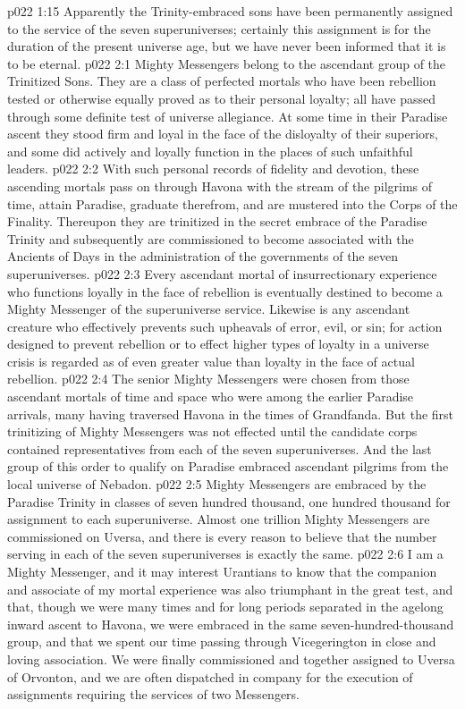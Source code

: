 \vs p022 1:15 Apparently the Trinity\hyp{}embraced sons have been permanently assigned to the service of the seven superuniverses; certainly this assignment is for the duration of the present universe age, but we have never been informed that it is to be eternal.
\vs p022 2:1 Mighty Messengers belong to the ascendant group of the Trinitized Sons. They are a class of perfected mortals who have been rebellion tested or otherwise equally proved as to their personal loyalty; all have passed through some definite test of universe allegiance. At some time in their Paradise ascent they stood firm and loyal in the face of the disloyalty of their superiors, and some did actively and loyally function in the places of such unfaithful leaders.
\vs p022 2:2 With such personal records of fidelity and devotion, these ascending mortals pass on through Havona with the stream of the pilgrims of time, attain Paradise, graduate therefrom, and are mustered into the Corps of the Finality. Thereupon they are trinitized in the secret embrace of the Paradise Trinity and subsequently are commissioned to become associated with the Ancients of Days in the administration of the governments of the seven superuniverses.
\vs p022 2:3 Every ascendant mortal of insurrectionary experience who functions loyally in the face of rebellion is eventually destined to become a Mighty Messenger of the superuniverse service. Likewise is any ascendant creature who effectively prevents such upheavals of error, evil, or sin; for action designed to prevent rebellion or to effect higher types of loyalty in a universe crisis is regarded as of even greater value than loyalty in the face of actual rebellion.
\vs p022 2:4 The senior Mighty Messengers were chosen from those ascendant mortals of time and space who were among the earlier Paradise arrivals, many having traversed Havona in the times of Grandfanda. But the first trinitizing of Mighty Messengers was not effected until the candidate corps contained representatives from each of the seven superuniverses. And the last group of this order to qualify on Paradise embraced ascendant pilgrims from the local universe of Nebadon.
\vs p022 2:5 Mighty Messengers are embraced by the Paradise Trinity in classes of seven hundred thousand, one hundred thousand for assignment to each superuniverse. Almost one trillion Mighty Messengers are commissioned on Uversa, and there is every reason to believe that the number serving in each of the seven superuniverses is exactly the same.
\vs p022 2:6 \pc I am a Mighty Messenger, and it may interest Urantians to know that the companion and associate of my mortal experience was also triumphant in the great test, and that, though we were many times and for long periods separated in the agelong inward ascent to Havona, we were embraced in the same seven\hyp{}hundred\hyp{}thousand group, and that we spent our time passing through Vicegerington in close and loving association. We were finally commissioned and together assigned to Uversa of Orvonton, and we are often dispatched in company for the execution of assignments requiring the services of two Messengers.
